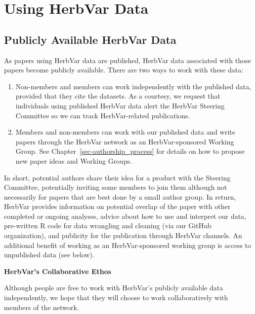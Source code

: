 \documentclass[
  letterpaper,
  oneside,
  open=any]{scrbook}
\begin{document}
\chapter{Using HerbVar Data}\label{using-herbvar-data}

\section{Publicly Available HerbVar Data}\label{sec-data_use_guidelines}

As papers using HerbVar data are published, HerbVar data associated with
those papers become publicly available. There are two ways to work with
these data:

\begin{enumerate}
\def\labelenumi{\arabic{enumi}.}
\item
  Non-members and members can work independently with the published
  data, provided that they cite the datasets. As a courtesy, we request
  that individuals using published HerbVar data alert the HerbVar
  Steering Committee so we can track HerbVar-related publications.
\item
  Members and non-members can work with our published data and write
  papers through the HerbVar network as an HerbVar-sponsored Working
  Group. See Chapter~\ref{sec-authorship_process} for details on how to
  propose new paper ideas and Working Groups.
\end{enumerate}

In short, potential authors share their idea for a product with the
Steering Committee, potentially inviting some members to join them
although not necessarily for papers that are best done by a small author
group. In return, HerbVar provides information on potential overlap of
the paper with other completed or ongoing analyses, advice about how to
use and interpret our data, pre-written R code for data wrangling and
cleaning (via our GitHub organization), and publicity for the
publication through HerbVar channels. An additional benefit of working
as an HerbVar-sponsored working group is access to unpublished data (see
below).

\begin{tcolorbox}[enhanced jigsaw, colback=white, rightrule=.15mm, leftrule=.75mm, arc=.35mm, toprule=.15mm, colframe=quarto-callout-note-color-frame, opacityback=0, left=2mm, breakable, bottomrule=.15mm]
\begin{minipage}[t]{5.5mm}
\textcolor{quarto-callout-note-color}{\faInfo}
\end{minipage}%
\begin{minipage}[t]{\textwidth - 5.5mm}

\vspace{-3mm}\textbf{HerbVar's Collaborative Ethos}\vspace{3mm}

Although people are free to work with HerbVar's publicly available data
independently, we hope that they will choose to work collaboratively
with members of the network.

\end{minipage}%
\end{tcolorbox}
\end{document}
